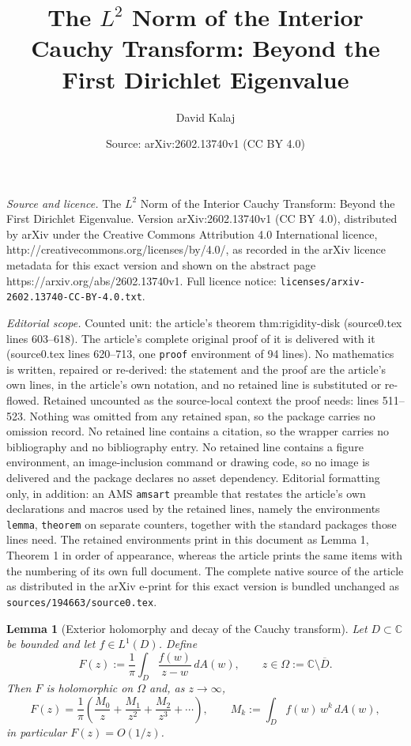 \documentclass[10pt,a4paper]{amsart}
\title{The $L^2$ Norm of the Interior Cauchy Transform: Beyond the First Dirichlet Eigenvalue}
\author{David Kalaj}
\date{Source: arXiv:2602.13740v1 (CC BY 4.0)}
\newtheorem{lemma}{Lemma}
\newcommand{\C}{\mathbb{C}}
\begin{document}
\maketitle

\noindent\emph{Source and licence.} The $L^2$ Norm of the Interior Cauchy Transform: Beyond the First Dirichlet Eigenvalue. Version arXiv:2602.13740v1 (CC BY 4.0), distributed by arXiv under the Creative Commons Attribution 4.0 International licence, http://creativecommons.org/licenses/by/4.0/, as recorded in the arXiv licence metadata for this exact version and shown on the abstract page https://arxiv.org/abs/2602.13740v1. Full licence notice: \texttt{licenses/arxiv-2602.13740-CC-BY-4.0.txt}.\par\smallskip

\noindent\textit{Editorial scope.} Counted unit: the article's theorem thm:rigidity-disk (source0.tex lines 603--618). The article's complete original proof of it is delivered with it (source0.tex lines 620--713, one \texttt{proof} environment of 94 lines). No mathematics is written, repaired or re-derived: the statement and the proof are the article's own lines, in the article's own notation, and no retained line is substituted or re-flowed.  Retained uncounted as the source-local context the proof needs: lines 511--523.  Nothing was omitted from any retained span, so the package carries no omission record.  No retained line contains a citation, so the wrapper carries no bibliography and no bibliography entry.  No retained line contains a figure environment, an image-inclusion command or drawing code, so no image is delivered and the package declares no asset dependency.  Editorial formatting only, in addition: an AMS \texttt{amsart} preamble that restates the article's own declarations and macros used by the retained lines, namely the environments \texttt{lemma}, \texttt{theorem} on separate counters, together with the standard packages those lines need.  The retained environments print in this document as Lemma 1, Theorem 1 in order of appearance, whereas the article prints the same items with the numbering of its own full document.  The complete native source of the article as distributed in the arXiv e-print for this exact version is bundled unchanged as \texttt{sources/194663/source0.tex}.
\begin{lemma}[Exterior holomorphy and decay of the Cauchy transform]\label{lem:ext-holo-decay}
Let $D\subset\C$ be bounded and let $f\in L^1(D)$. Define
\[
F(z):=\frac1\pi\int_D \frac{f(w)}{z-w}\,dA(w),\qquad z\in\Omega:=\C\setminus\overline D.
\]
Then $F$ is holomorphic on $\Omega$ and, as $z\to\infty$,
\[
F(z)=\frac{1}{\pi}\left(\frac{M_0}{z}+\frac{M_1}{z^2}+\frac{M_2}{z^3}+\cdots\right),
\qquad
M_k:=\int_D f(w)\,w^k\,dA(w),
\]
in particular $F(z)=O(1/z)$.
\end{lemma}
\end{document}
